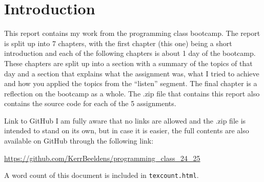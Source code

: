 \chapter{Introduction}
This report contains my work from the programming class bootcamp. The report is split up into 7 chapters, with the first chapter (this one) being a short introduction and each of the following chapters is about 1 day of the bootcamp. These chapters are split up into a section with a summary of the topics of that day and a section that explains what the assignment was, what I tried to achieve and how you applied the topics from the ``listen'' segment. The final chapter is a reflection on the bootcamp as a whole. The .zip file that contains this report also contains the source code for each of the 5 assignments.

\medskip

\begin{hyperlinkbox}{Link to GitHub}
    I am fully aware that no links are allowed and the .zip file is intended to stand on its own, but in case it is easier, the full contents are also available on GitHub through the following link:

    \medskip

    \href{https://github.com/KerrBeeldens/programming_class_24_25}{https://github.com/KerrBeeldens/programming\_class\_24\_25}
\end{hyperlinkbox}

A word count of this document is included in \texttt{texcount.html}.